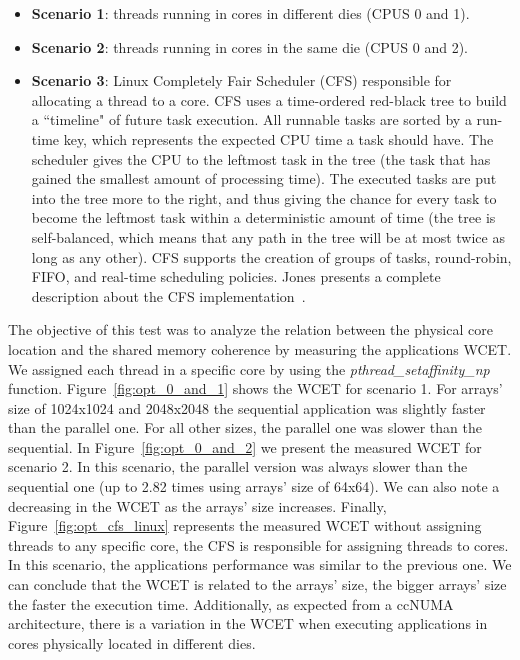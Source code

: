 \documentclass[conference]{IEEEtran}
\begin{document}
\begin{itemize}
	\item \textbf{Scenario 1}: threads running in cores in different dies (CPUS 0 and 1).
	\item \textbf{Scenario 2}: threads running in cores in the same die (CPUS 0 and 2).
	\item \textbf{Scenario 3}: Linux Completely Fair Scheduler (CFS) responsible for allocating a thread to a core. CFS uses a time-ordered red-black tree to build a ``timeline" of future task execution. All runnable tasks are sorted by a run-time key, which represents the expected CPU time a task should have. The scheduler gives the CPU to the leftmost task in the tree (the task that has gained the smallest amount of processing time). The executed tasks are put into the tree more to the right, and thus giving the chance for every task to become the leftmost task within a deterministic amount of time (the tree is self-balanced, which means that any path in the tree will be at most twice as long as any other). CFS supports the creation of groups of tasks, round-robin, FIFO, and real-time scheduling policies. Jones presents a complete description about the CFS implementation~\cite{Jones:2009}.
\end{itemize}

The objective of this test was to analyze the relation between the physical core location and the shared memory coherence by measuring the applications WCET. We assigned each thread in a specific core by using the \emph{pthread\_setaffinity\_np} function. Figure~\ref{fig:opt_0_and_1} shows the WCET for scenario 1. For arrays' size of 1024x1024 and 2048x2048 the sequential application was slightly faster than the parallel one. For all other sizes, the parallel one was slower than the sequential. In Figure~\ref{fig:opt_0_and_2} we present the measured WCET for scenario 2. In this scenario, the parallel version was always slower than the sequential one (up to 2.82 times using arrays' size of 64x64). We can also note a decreasing in the WCET as the arrays' size increases. Finally, Figure~\ref{fig:opt_cfs_linux} represents the measured WCET without assigning threads to any specific core, the CFS is responsible for assigning threads to cores. In this scenario, the applications performance was similar to the previous one. We can conclude that the WCET is related to the arrays' size, the bigger arrays' size the faster the execution time. Additionally, as expected from a ccNUMA architecture, there is a variation in the WCET when executing applications in cores physically located in different dies.
\end{document}
